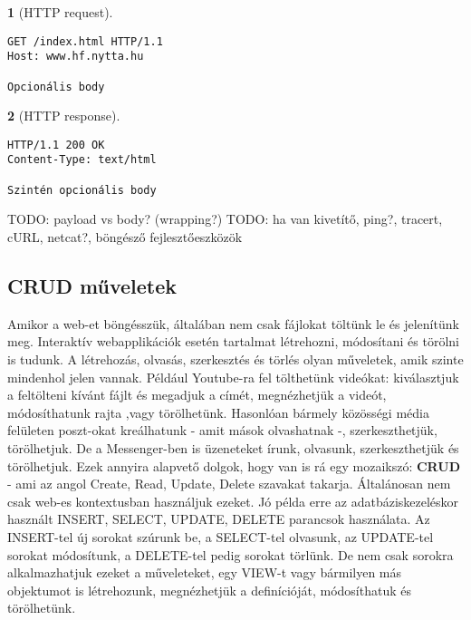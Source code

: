 \documentclass[a4paper, 12pt, oneside]{article}
\newtheorem*{defin}{}
\begin{document}
\begin{center}
\begin{defin}[HTTP request]
\end{defin}
\end{center}

\begin{verbatim}
GET /index.html HTTP/1.1
Host: www.hf.nytta.hu

Opcionális body
\end{verbatim}

\begin{center}
\begin{defin}[HTTP response]
\end{defin}
\end{center}

\begin{verbatim}
HTTP/1.1 200 OK
Content-Type: text/html

Szintén opcionális body
\end{verbatim}


TODO: payload vs body? (wrapping?)
TODO: ha van kivetítő, ping?, tracert, cURL, netcat?, böngésző fejlesztőeszközök
\pagebreak

\subsection*{CRUD műveletek}

Amikor a web-et böngésszük, általában nem csak fájlokat töltünk le és jelenítünk meg. Interaktív webapplikációk esetén tartalmat létrehozni, módosítani és törölni is tudunk. A létrehozás, olvasás, szerkesztés és törlés olyan műveletek, amik szinte mindenhol jelen vannak. Például Youtube-ra fel tölthetünk videókat: kiválasztjuk a feltölteni kívánt fájlt és megadjuk a címét, megnézhetjük a videót, módosíthatunk rajta ,vagy törölhetünk. Hasonlóan bármely közösségi média felületen poszt-okat kreálhatunk - amit mások olvashatnak -, szerkeszthetjük, törölhetjuk. De a Messenger-ben is üzeneteket írunk, olvasunk, szerkeszthetjük és törölhetjuk. Ezek annyira alapvető dolgok, hogy van is rá egy mozaikszó: \textbf{CRUD} - ami az angol Create, Read, Update, Delete szavakat takarja.
\bigbreak
Általánosan nem csak web-es kontextusban használjuk ezeket. Jó példa erre az adatbáziskezeléskor használt INSERT, SELECT, UPDATE, DELETE parancsok használata. Az INSERT-tel új sorokat szúrunk be, a SELECT-tel olvasunk, az UPDATE-tel sorokat módosítunk, a DELETE-tel pedig sorokat törlünk. De nem csak sorokra alkalmazhatjuk ezeket a műveleteket, egy VIEW-t vagy bármilyen más objektumot is létrehozunk, megnézhetjük a definícióját, módosíthatuk és törölhetünk.
\end{document}
